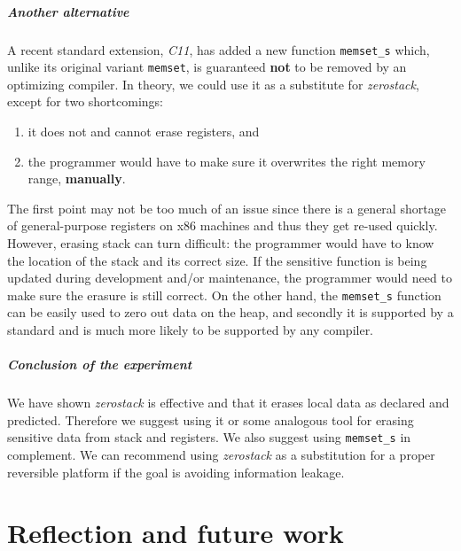 \documentclass[a4paper,10pt,openright]{memoir}
\newcommand{\term}[1]{\textit{#1}}
\newcommand{\code}[1]{\texttt{#1}}
\begin{document}
\paragraph{Another alternative}

A recent standard extension, \term{C11}, has added a new function 
\code{memset\_s} which, unlike its original variant \code{memset}, is 
guaranteed \textbf{not} to be removed by an optimizing compiler. In 
theory, we could use it as a substitute for \term{zerostack}, except 
for two shortcomings:

\begin{enumerate}
\item it does not and cannot erase registers, and
\item the programmer would have to make sure it overwrites the right memory range, \textbf{manually}.
\end{enumerate}

The first point may not be too much of an issue since there is a 
general shortage of general-purpose registers on x86 machines and thus 
they get re-used quickly. However, erasing stack can turn difficult: 
the programmer would have to know the location of the stack and its 
correct size. If the sensitive function is being updated during 
development and/or maintenance, the programmer would need to make sure 
the erasure is still correct. On the other hand, the \code{memset\_s} 
function can be easily used to zero out data on the heap, and secondly 
it is supported by a standard and is much more likely to be supported 
by any compiler.

\paragraph{Conclusion of the experiment}

We have shown \term{zerostack} is effective and that it erases local 
data as declared and predicted. Therefore we suggest using it or some 
analogous tool for erasing sensitive data from stack and registers. We 
also suggest using \code{memset\_s} in complement. We can recommend 
using \term{zerostack} as a substitution for a proper reversible 
platform if the goal is avoiding information leakage.


\chapter{Reflection and future work}

\end{document}
